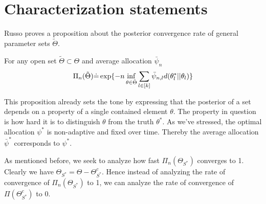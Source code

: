 \section{Characterization statements}\label{section:optimal_statements}
Russo proves a proposition about the posterior convergence rate of general
parameter sets $\tilde{\Theta}$.

\begin{proposition}\label{proposition:prop5}
  For any open set $\tilde{\Theta} \subset \Theta$ and average allocation
  $\bar{\psi}_n$
  \begin{align}
    \Pi_n(\tilde{\Theta}) \dot{=} \exp\{-n \inf_{\theta \in
        \tilde{\Theta}} \sum_{l \in [k]} \bar{\psi}_{n, l} d(\theta^*_l ||
        \theta_l)\}
  \end{align}
\end{proposition}

This proposition already sets the tone by expressing that the posterior of a set
depends on a property of a single contained element $\theta$. The property in
question is how hard it is to distinguish $\theta$ from the truth $\theta^*$. As
we've stressed, the optimal allocation $\psi^*$ is non-adaptive and fixed over
time. Thereby the average allocation $\bar{\psi}^*$ corresponds to
$\psi^*$.

As mentioned before, we seek to analyze how fast $\Pi_n(\Theta_{S^*})$ converges
to 1. Clearly we have $\Theta_{S^*} = \Theta - \Theta_{S^*}^c$. Hence instead of
analyzing the rate of convergence of $\Pi_n(\Theta_{S^*})$ to 1, we can analyze
the rate of convergence of $\Pi(\Theta_{S^*}^c)$ to 0.


